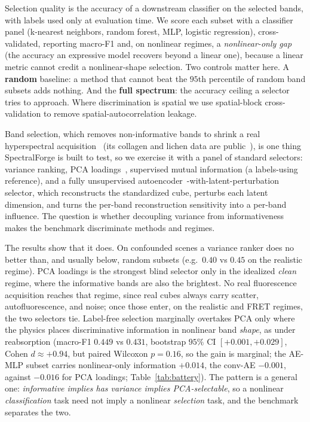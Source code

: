 \documentclass{article}
\makeatletter
\renewcommand\section{\@startsection{section}{1}{\z@}{9pt}{4pt}{\normalfont\bfseries}}
\makeatother
\begin{document}
Selection quality is the accuracy of a downstream classifier on the selected bands, with labels
used only at evaluation time. We score each subset with a classifier
panel (k-nearest neighbors, random forest, MLP, logistic regression), cross-validated,
reporting macro-F1 and, on nonlinear regimes, a \emph{nonlinear-only gap} (the accuracy
an expressive model recovers beyond a linear one), because a linear metric cannot credit
a nonlinear-shape selection. Two controls matter here. A \textbf{random}
baseline: a method that cannot beat the $95$th percentile of random band subsets adds
nothing. And the \textbf{full spectrum}: the accuracy ceiling a selector tries to
approach. Where
discrimination is spatial we use spatial-block cross-validation to remove
spatial-autocorrelation leakage.

\section{Using the Benchmark}
Band selection, which removes non-informative bands to shrink a real hyperspectral
acquisition~\cite{ref_guan,ref_scirep,ref_bsnet} (its collagen and lichen data are public~\cite{ref_zen_collagen,ref_zen_lichens}), is one thing SpectralForge is built to test, so we exercise it with a
panel of standard selectors: variance ranking, PCA loadings~\cite{ref_jolliffe}, supervised mutual information (a
labels-using reference), and a fully unsupervised autoencoder~\cite{ref_hinton}-with-latent-perturbation
selector, which reconstructs the standardized cube, perturbs each latent dimension, and
turns the per-band reconstruction sensitivity into a per-band influence. The question is whether decoupling variance from informativeness makes the benchmark discriminate methods and regimes.

The results show that it does. On confounded scenes a variance ranker does no better than, and usually below, random subsets (e.g.\ $0.40$ vs $0.45$ on the realistic regime). PCA loadings is the
strongest blind selector only in the idealized \emph{clean} regime, where the informative
bands are also the brightest. No real fluorescence acquisition reaches that regime, since
real cubes always carry scatter, autofluorescence, and noise; once those enter, on the
realistic and FRET regimes, the two selectors tie. Label-free selection marginally overtakes PCA only
where the physics places discriminative information in nonlinear band \emph{shape}, as under
reabsorption (macro-F1 $0.449$ vs $0.431$, bootstrap $95\%$ CI $[+0.001,+0.029]$, Cohen
$d\approx+0.94$, but paired Wilcoxon $p=0.16$, so the gain is marginal; the AE-MLP subset carries nonlinear-only
information $+0.014$, the conv-AE $-0.001$, against $-0.016$ for PCA loadings; Table~\ref{tab:battery}). The pattern is a general one:
\emph{informative implies has variance implies PCA-selectable}, so a nonlinear
\emph{classification} task need not imply a nonlinear \emph{selection} task, and the
benchmark separates the two.
\end{document}

